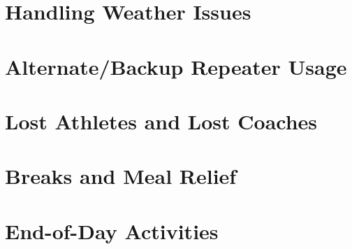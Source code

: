 \documentclass[pdflatex,letterpaper,twoside,12pt]{book}
\begin{document}

\section{Handling Weather Issues}

\iffalse %
 * Clearly define process or criteria in which we begin collecting or
   disseminating weather data? 
\fi %


\section{Alternate/Backup Repeater Usage}


\section{Lost Athletes and Lost Coaches}


\section{Breaks and Meal Relief}

\iffalse %
Director will now be responsible for getting meals to the net control folks, 
this worked perfect this time!
\fi %


\section{End-of-Day Activities}

\iffalse %
 * Need notice for security to charge radios at night
     o Send a reminder voice communication Friday and Saturday Evenings
       (Logistics Control) 
\fi %
\end{document}
